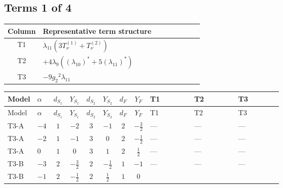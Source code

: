 \documentclass[8pt]{article}
\begin{document}
\begin{landscape}
\subsection*{Terms 1 of 4}
\begin{center}
\begin{tabular}{@{}c >{\raggedright\arraybackslash}p{0.82\linewidth}@{}}
\toprule
Column & Representative term structure \\
\midrule
T1 & \(\displaystyle {\lambda_{11}} (3 T_{\nu}^{(1)}+T_{\nu}^{(2)})\) \\
\midrule
T2 & \(\displaystyle +4 {\lambda_{9}} (\left({\lambda_{10}}\right)^{*}+5 \left({\lambda_{11}}\right)^{*})\) \\
\midrule
T3 & \(\displaystyle -9 {g_2}^2 {\lambda_{11}}\) \\
\midrule
\bottomrule
\end{tabular}
\end{center}
\smallskip
\tiny
\begin{longtable}{@{}llcccccc >{\raggedright\arraybackslash}p{0.21\linewidth} >{\raggedright\arraybackslash}p{0.21\linewidth} >{\raggedright\arraybackslash}p{0.21\linewidth}@{}}
\toprule
Model & $\alpha$ & $d_{S_1}$ & $Y_{S_1}$ & $d_{S_2}$ & $Y_{S_2}$ & $d_F$ & $Y_F$ & T1 & T2 & T3 \\
\midrule
\endfirsthead
\toprule
Model & $\alpha$ & $d_{S_1}$ & $Y_{S_1}$ & $d_{S_2}$ & $Y_{S_2}$ & $d_F$ & $Y_F$ & T1 & T2 & T3 \\
\midrule
\endhead
T3-A & $-4$ & $1$ & $-2$ & $3$ & $-1$ & $2$ & $-\frac{3}{2}$ & --- & --- & --- \\
\midrule
T3-A & $-2$ & $1$ & $-1$ & $3$ & $0$ & $2$ & $-\frac{1}{2}$ & --- & --- & --- \\
\midrule
T3-A & $0$ & $1$ & $0$ & $3$ & $1$ & $2$ & $\frac{1}{2}$ & --- & --- & --- \\
\midrule
T3-B & $-3$ & $2$ & $-\frac{3}{2}$ & $2$ & $-\frac{1}{2}$ & $1$ & $-1$ & --- & --- & --- \\
\midrule
T3-B & $-1$ & $2$ & $-\frac{1}{2}$ & $2$ & $\frac{1}{2}$ & $1$ & $0$ & \scriptsize\adjustbox{max width=\linewidth}{$\begin{gathered} {\lambda_{11}} (3 T_{\nu}^{(1)}+T_{\nu}^{(2)})\end{gathered}$} & \scriptsize\adjustbox{max width=\linewidth}{$\begin{gathered} +4 {\lambda_{9}} (\left({\lambda_{10}}\right)^{*}+5 \left({\lambda_{11}}\right)^{*})\end{gathered}$} & \scriptsize\adjustbox{max width=\linewidth}{$\begin{gathered} -9 {g_2}^2 {\lambda_{11}}\end{gathered}$} \\

\end{longtable}
\end{landscape}
\end{document}
